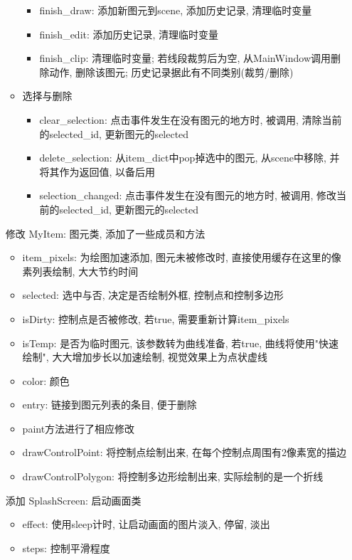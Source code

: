 \documentclass[a4paper,UTF8]{article}
\theoremstyle{definition}
\begin{document}
\begin{itemize}
\begin{itemize}
\begin{itemize}
      \item finish\_draw: 添加新图元到scene, 添加历史记录, 清理临时变量
      \item finish\_edit: 添加历史记录, 清理临时变量
      \item finish\_clip: 清理临时变量; 若线段裁剪后为空, 从MainWindow调用删除动作, 删除该图元; 历史记录据此有不同类别(裁剪/删除)
    \end{itemize}
    \item 选择与删除\begin{itemize}
      \item clear\_selection: 点击事件发生在没有图元的地方时, 被调用, 清除当前的selected\_id, 更新图元的selected
      \item delete\_selection: 从item\_dict中pop掉选中的图元, 从scene中移除, 并将其作为返回值, 以备后用
      \item selection\_changed: 点击事件发生在没有图元的地方时, 被调用, 修改当前的selected\_id, 更新图元的selected
    \end{itemize}
  \end{itemize}
  \item [修改]MyItem: 图元类, 添加了一些成员和方法\begin{itemize}
    \item item\_pixels: 为绘图加速添加, 图元未被修改时, 直接使用缓存在这里的像素列表绘制, 大大节约时间
    \item selected: 选中与否, 决定是否绘制外框, 控制点和控制多边形
    \item isDirty: 控制点是否被修改, 若true, 需要重新计算item\_pixels
    \item isTemp: 是否为临时图元, 该参数转为曲线准备, 若true, 曲线将使用"快速绘制", 大大增加步长以加速绘制, 视觉效果上为点状虚线
    \item color: 颜色
    \item entry: 链接到图元列表的条目, 便于删除
    \item paint方法进行了相应修改
    \item drawControlPoint: 将控制点绘制出来, 在每个控制点周围有2像素宽的描边
    \item drawControlPolygon: 将控制多边形绘制出来, 实际绘制的是一个折线
  \end{itemize}
  \item [添加]SplashScreen: 启动画面类\begin{itemize}
    \item effect: 使用sleep计时, 让启动画面的图片淡入, 停留, 淡出
    \item steps: 控制平滑程度

\end{itemize}
\end{itemize}
\end{document}
